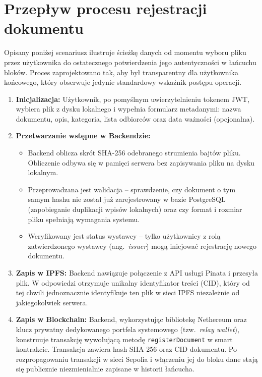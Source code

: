 \documentclass[12pt,a4paper,twoside]{report}
\begin{document}
\newpage
\section{Przepływ procesu rejestracji dokumentu}

Opisany poniżej scenariusz ilustruje ścieżkę danych od momentu wyboru pliku przez
użytkownika do ostatecznego potwierdzenia jego autentyczności w łańcuchu bloków. Proces
zaprojektowano tak, aby był transparentny dla użytkownika końcowego, który obserwuje
jedynie standardowy wskaźnik postępu operacji.

\begin{enumerate}
    \item \textbf{Inicjalizacja:} Użytkownik, po pomyślnym uwierzytelnieniu tokenem JWT,
          wybiera plik z dysku lokalnego i wypełnia formularz metadanymi: nazwa dokumentu,
          opis, kategoria, lista odbiorców oraz data ważności (opcjonalna).

    \item \textbf{Przetwarzanie wstępne w Backendzie:}
    \begin{itemize}
        \item Backend oblicza skrót SHA-256 odebranego strumienia bajtów pliku. Obliczenie
              odbywa się w pamięci serwera bez zapisywania pliku na dysku lokalnym.
        \item Przeprowadzana jest walidacja -- sprawdzenie, czy dokument o tym samym hashu
              nie został już zarejestrowany w bazie PostgreSQL (zapobieganie duplikacji
              wpisów lokalnych) oraz czy format i rozmiar pliku spełniają wymagania systemu.
        \item Weryfikowany jest status wystawcy -- tylko użytkownicy z rolą zatwierdzonego
              wystawcy (ang.~\textit{issuer}) mogą inicjować rejestrację nowego dokumentu.
    \end{itemize}

    \item \textbf{Zapis w IPFS:} Backend nawiązuje połączenie z API usługi Pinata
          i przesyła plik. W odpowiedzi otrzymuje unikalny identyfikator treści (CID),
          który od tej chwili jednoznacznie identyfikuje ten plik w sieci IPFS niezależnie
          od jakiegokolwiek serwera.

    \item \textbf{Zapis w Blockchain:} Backend, wykorzystując bibliotekę Nethereum oraz
          klucz prywatny dedykowanego portfela systemowego (tzw.~\textit{relay wallet}),
          konstruuje transakcję wywołującą metodę \texttt{registerDocument} w smart
          kontrakcie. Transakcja zawiera hash SHA-256 oraz CID dokumentu. Po
          rozpropagowaniu transakcji w sieci Sepolia i włączeniu jej do bloku dane stają
          się publicznie niezmienialnie zapisane w historii łańcucha.


\end{enumerate}
\end{document}
